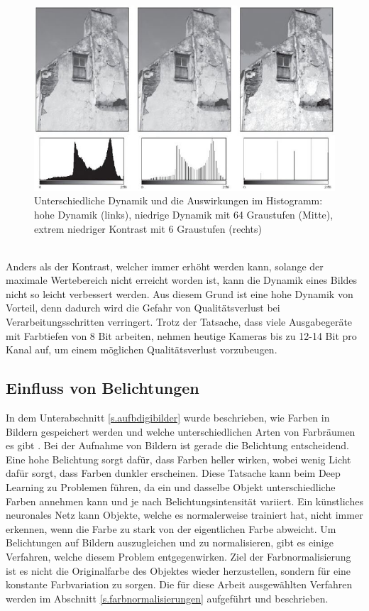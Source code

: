  \begin{figure}
    [h]
    \centering
    \includegraphics[scale=0.6]{Sources/dynamik.JPG}
    \caption{Unterschiedliche Dynamik und die Auswirkungen im Histogramm: hohe Dynamik (links), niedrige Dynamik mit 64 Graustufen (Mitte), extrem niedriger Kontrast mit 6 Graustufen (rechts)\cite[45]{burger2009digitale}}
    \label{img:dynamik}
  \end{figure}\\
Anders als der Kontrast, welcher immer erhöht werden kann, solange der maximale Wertebereich nicht erreicht worden ist, kann die Dynamik eines Bildes nicht so leicht verbessert werden. Aus diesem Grund ist eine hohe Dynamik von Vorteil, denn dadurch wird die Gefahr von Qualitätsverlust bei Verarbeitungsschritten verringert. Trotz der Tatsache, dass viele Ausgabegeräte mit Farbtiefen von 8 Bit arbeiten, nehmen heutige Kameras bis zu 12-14 Bit pro Kanal auf, um einem möglichen Qualitätsverlust vorzubeugen.
\subsection{Einfluss von Belichtungen}\label{s.belichtung}
In dem Unterabschnitt \ref{s.aufbdigibilder} wurde beschrieben, wie Farben in Bildern gespeichert werden und welche unterschiedlichen Arten von Farbräumen es gibt \cite[41ff.]{burger2009digitale}. Bei der Aufnahme von Bildern ist gerade die Belichtung entscheidend. Eine hohe Belichtung sorgt dafür, dass Farben heller wirken, wobei wenig Licht dafür sorgt, dass Farben dunkler erscheinen. Diese Tatsache kann beim Deep Learning zu Problemen führen, da ein und dasselbe Objekt unterschiedliche Farben annehmen kann und je nach Belichtungsintensität variiert. Ein künstliches neuronales Netz kann Objekte, welche es normalerweise trainiert hat, nicht immer erkennen, wenn die Farbe zu stark von der eigentlichen Farbe abweicht. Um Belichtungen auf Bildern auszugleichen und zu normalisieren, gibt es einige Verfahren, welche diesem Problem entgegenwirken. Ziel der Farbnormalisierung ist es nicht die Originalfarbe des Objektes wieder herzustellen, sondern für eine konstante Farbvariation zu sorgen. Die für diese Arbeit ausgewählten Verfahren werden im Abschnitt \ref{s.farbnormalisierungen} aufgeführt und beschrieben. 
